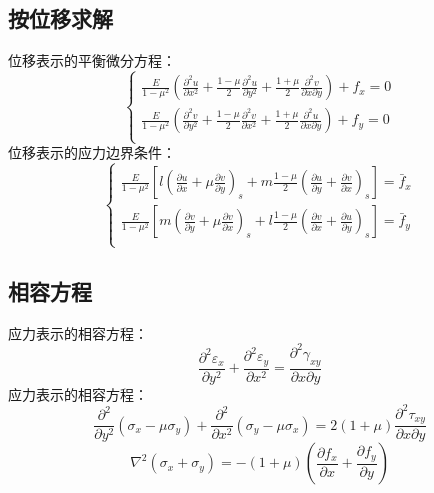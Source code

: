 \subsection{按位移求解}
位移表示的平衡微分方程：
\begin{equation}
	\begin{cases}
	\frac{E}{1-\mu ^2}\left( \frac{\partial ^2u}{\partial x^2}+\frac{1-\mu}{2}\frac{\partial ^2u}{\partial y^2}+\frac{1+\mu}{2}\frac{\partial ^2v}{\partial x\partial y} \right) +f_x=0\\
	\frac{E}{1-\mu ^2}\left( \frac{\partial ^2v}{\partial y^2}+\frac{1-\mu}{2}\frac{\partial ^2v}{\partial x^2}+\frac{1+\mu}{2}\frac{\partial ^2u}{\partial x\partial y} \right) +f_y=0\\
	\end{cases}
\end{equation}
\hspace*{2em}位移表示的应力边界条件：
\begin{equation}
	\begin{cases}
	\frac{E}{1-\mu ^2}\left[ l\left( \frac{\partial u}{\partial x}+\mu \frac{\partial v}{\partial y} \right) _s+m\frac{1-\mu}{2}\left( \frac{\partial u}{\partial y}+\frac{\partial v}{\partial x} \right) _s \right] =\bar{f}_x\\
	\frac{E}{1-\mu ^2}\left[ m\left( \frac{\partial v}{\partial y}+\mu \frac{\partial v}{\partial x} \right) _s+l\frac{1-\mu}{2}\left( \frac{\partial v}{\partial x}+\frac{\partial u}{\partial y} \right) _s \right] =\bar{f}_y\\
	\end{cases}
\end{equation}
\subsection{相容方程}
应力表示的相容方程：
\begin{equation}
	\frac{\partial ^2\varepsilon _x}{\partial y^2}+\frac{\partial ^2\varepsilon _y}{\partial x^2}=\frac{\partial ^2\gamma _{xy}}{\partial x\partial y}
\end{equation}
\hspace*{2em}应力表示的相容方程：
\begin{equation}
	\frac{\partial ^2}{\partial y^2}\left( \sigma _x-\mu \sigma _y \right) +\frac{\partial ^2}{\partial x^2}\left( \sigma _y-\mu \sigma _x \right) =2\left( 1+\mu \right) \frac{\partial ^2\tau _{xy}}{\partial x\partial y} 
\end{equation}
\begin{equation}
	\nabla ^2\left( \sigma _x+\sigma _y \right) =-\left( 1+\mu \right) \left( \frac{\partial f_x}{\partial x}+\frac{\partial f_y}{\partial y} \right)
\end{equation}
